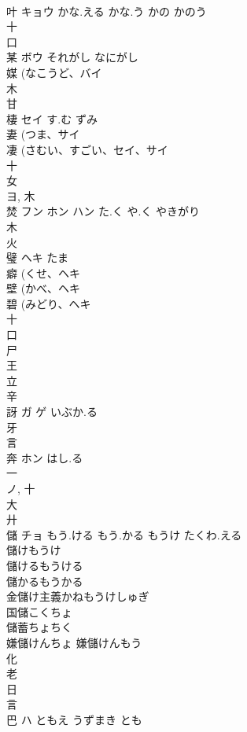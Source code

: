 \documentclass[8pt]{extreport}
\begin{document}
\begin{CJK}{UTF8}{min}
\\	叶	キョウ	かな.える かな.う かの かのう	
\\	十 
\\	口 
\\	某	ボウ	それがし なにがし	
\\	媒 (なこうど、バイ 
\\	木 
\\	甘 
\\	棲	セイ	す.む ずみ	
\\	妻 (つま、サイ 
\\	凄 (さむい、すごい、セイ、サイ 
\\	十 
\\	女 
\\	ヨ, 木 
\\	焚	フン ホン ハン	た.く や.く やきがり	
\\	木 
\\	火 
\\	璧	ヘキ	たま	
\\	癖 (くせ、ヘキ 
\\	壁 (かべ、ヘキ 
\\	碧 (みどり、ヘキ 
\\	十 
\\	口 
\\	尸 
\\	王 
\\	立 
\\	辛 
\\	訝	ガ ゲ	いぶか.る	
\\	牙 
\\	言 
\\	奔	ホン	はし.る	
\\	一 
\\	ノ, 十 
\\	大 
\\	廾 
\\	儲	チョ	もう.ける もう.かる もうけ たくわ.える	
\\	儲けもうけ 
\\	儲けるもうける 
\\	儲かるもうかる 
\\	金儲け主義かねもうけしゅぎ 
\\	国儲こくちょ 
\\	儲蓄ちょちく 
\\	嫌儲けんちょ 嫌儲けんもう 
\\	化 
\\	老 
\\	日 
\\	言 
\\	巴	ハ	ともえ うずまき とも	

\end{CJK}
\end{document}
